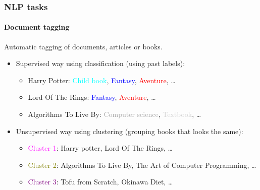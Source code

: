 \documentclass[9pt]{beamer}
\begin{document}
\begin{frame}
  \frametitle{NLP tasks}

  \framesubtitle{Document tagging}

  Automatic tagging of documents, articles or books.

  \bigskip

  \begin{itemize}
  \item Supervised way using classification (using past labels):
    \begin{itemize}
    \item Harry Potter: \textcolor{cyan}{Child book}, \textcolor{blue}{Fantasy},
      \textcolor{red}{Aventure}, \dots
    \item Lord Of The Rings: \textcolor{blue}{Fantasy},
      \textcolor{red}{Aventure}, \dots
    \item Algorithms To Live By: \textcolor{darkgray}{Computer
      science}, \textcolor{lightgray}{Textbook}, \dots
    \end{itemize}

    \bigskip

  \item Unsupervised way using clustering (grouping books that looks the same):
    \begin{itemize}
    \item \textcolor{magenta}{Cluster 1}: Harry potter, Lord Of The
      Rings, \dots
    \item \textcolor{olive}{Cluster 2}: Algorithms To Live By, The Art
      of Computer Programming, \dots
    \item \textcolor{purple}{Cluster 3}: Tofu from Scratch, Okinawa
      Diet, \dots
    \end{itemize}
  \end{itemize}
\end{frame}
\end{document}
